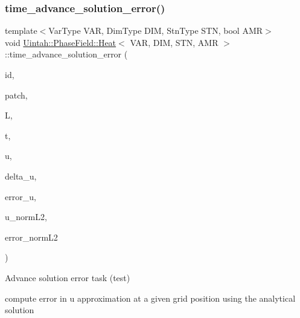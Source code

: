 \subsubsection{\texorpdfstring{time\+\_\+advance\+\_\+solution\+\_\+error()}{time\_advance\_solution\_error()}}
{\footnotesize\ttfamily template$<$Var\+Type V\+AR, Dim\+Type D\+IM, Stn\+Type S\+TN, bool A\+MR$>$ \\
void \hyperlink{classUintah_1_1PhaseField_1_1Heat}{Uintah\+::\+Phase\+Field\+::\+Heat}$<$ V\+AR, D\+IM, S\+TN, A\+MR $>$\+::time\+\_\+advance\+\_\+solution\+\_\+error (\begin{DoxyParamCaption}\item[{const Int\+Vector \&}]{id,  }\item[{const Patch $\ast$}]{patch,  }\item[{const double \&}]{L,  }\item[{const double \&}]{t,  }\item[{\hyperlink{namespaceUintah_1_1PhaseField_a59210a1e28eba254d428762c92ddeabb}{View}$<$ \hyperlink{structUintah_1_1PhaseField_1_1ScalarField}{Scalar\+Field}$<$ const double $>$ $>$ \&}]{u,  }\item[{\hyperlink{namespaceUintah_1_1PhaseField_a59210a1e28eba254d428762c92ddeabb}{View}$<$ \hyperlink{structUintah_1_1PhaseField_1_1ScalarField}{Scalar\+Field}$<$ double $>$ $>$ \&}]{delta\+\_\+u,  }\item[{\hyperlink{namespaceUintah_1_1PhaseField_a59210a1e28eba254d428762c92ddeabb}{View}$<$ \hyperlink{structUintah_1_1PhaseField_1_1ScalarField}{Scalar\+Field}$<$ double $>$ $>$ \&}]{error\+\_\+u,  }\item[{double \&}]{u\+\_\+norm\+L2,  }\item[{double \&}]{error\+\_\+norm\+L2 }\end{DoxyParamCaption})\hspace{0.3cm}{\ttfamily [protected]}}



Advance solution error task (test) 

compute error in u approximation at a given grid position using the analytical solution


